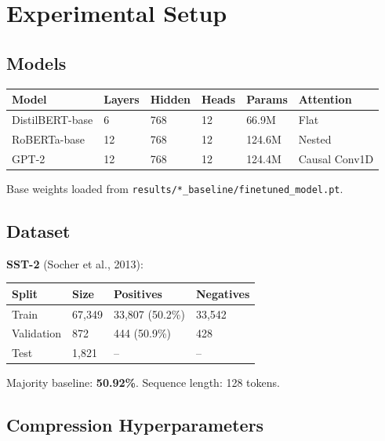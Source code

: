 
\section{Experimental Setup}

\subsection{Models}

\begin{table}[H]
\centering
\small
\begin{tabular}{llllll}
\toprule
\textbf{Model} & \textbf{Layers} & \textbf{Hidden} & \textbf{Heads} & \textbf{Params} & \textbf{Attention} \\
\midrule
DistilBERT-base & 6 & 768 & 12 & 66.9M & Flat \\
RoBERTa-base & 12 & 768 & 12 & 124.6M & Nested \\
GPT-2 & 12 & 768 & 12 & 124.4M & Causal Conv1D \\
\bottomrule
\end{tabular}
\end{table}

Base weights loaded from \texttt{results/*\_baseline/finetuned\_model.pt}.

\subsection{Dataset}

\textbf{SST-2} (Socher et al., 2013):

\begin{table}[H]
\centering
\small
\begin{tabular}{llll}
\toprule
\textbf{Split} & \textbf{Size} & \textbf{Positives} & \textbf{Negatives} \\
\midrule
Train & 67,349 & 33,807 (50.2\%) & 33,542 \\
Validation & 872 & 444 (50.9\%) & 428 \\
Test & 1,821 & -- & -- \\
\bottomrule
\end{tabular}
\end{table}

Majority baseline: \textbf{50.92\%}. Sequence length: 128 tokens.

\subsection{Compression Hyperparameters}

